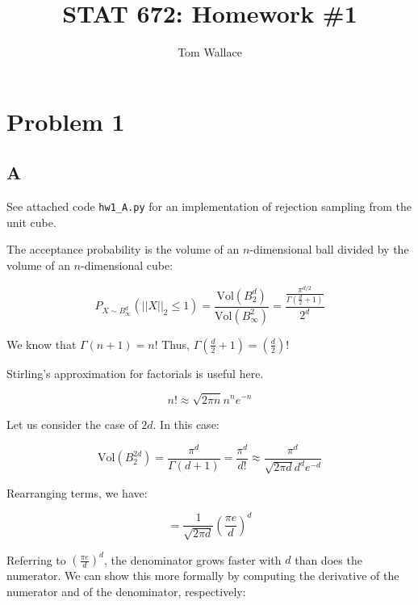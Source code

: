 \documentclass{article}
\title{STAT 672: Homework \#1}
\author{Tom Wallace}
\begin{document}
\maketitle

\section*{Problem 1}

\subsection*{A}

See attached code \texttt{hw1\_A.py} for an implementation of rejection sampling
from the unit cube.

\smallskip

The acceptance probability is the volume of an $n$-dimensional ball divided by
the volume of an $n$-dimensional cube:

\begin{equation}
P_{X \sim B^d_\infty}(||X||_2 \leq 1) =
\frac{\mathrm{Vol}(B^d_2)}{\mathrm{Vol}(B^2_\infty)}
= \frac{\frac{\pi ^ {d/2}}{\Gamma(\frac{d}{2} + 1)}}{2^d}
\end{equation}

We know that $\Gamma (n+1) = n!$ Thus, $\Gamma (\frac{d}{2} + 1) = (\frac{d}{2})!$

\smallskip

Stirling's approximation for factorials is useful here.

\begin{equation}
n! \approx \sqrt{2 \pi n}n^ne^{-n}
\end{equation}

Let us consider the case of $2d$. In this case:

\begin{equation}
\mathrm{Vol}(B^{2d}_2) = \frac{\pi ^ d}{\Gamma(d + 1)} = \frac{\pi^d}{d!}
\approx \frac{\pi^d}{\sqrt{2\pi d}d^de^{-d}}
\end{equation}

Rearranging terms, we have:

\begin{equation}
= \frac{1}{\sqrt{2\pi d}} \left( \frac{\pi e}{d} \right)^d
\end{equation}

Referring to $ \left( \frac{\pi e}{d} \right)^d$, the denominator grows faster with $d$ than does the
numerator. We
can show this more formally by computing the derivative of the numerator and of the
denominator, respectively:
\end{document}
